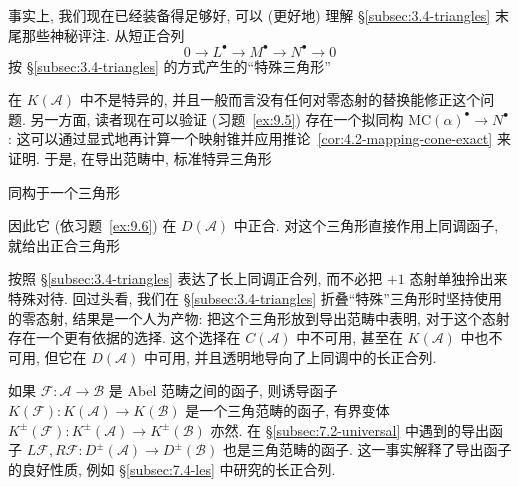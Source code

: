 事实上, 我们现在已经装备得足够好, 可以 (更好地) 理解 \S\ref{subsec:3.4-triangles} 末尾那些神秘评注. 从短正合列
\[
0 \longrightarrow L^\bullet \longrightarrow M^\bullet \longrightarrow N^\bullet \longrightarrow 0
\]
按 \S\ref{subsec:3.4-triangles} 的方式产生的“特殊三角形”
\begin{center}
\end{center}
在 $K(\mathcal{A})$ 中不是特异的, 并且一般而言没有任何对零态射的替换能修正这个问题. 另一方面, 读者现在可以验证 (习题~\ref{ex:9.5}) 存在一个拟同构 $\mathrm{MC}(\alpha)^\bullet\to N^\bullet$: 这可以通过显式地再计算一个映射锥并应用推论~\ref{cor:4.2-mapping-cone-exact} 来证明. 于是, 在导出范畴中, 标准特异三角形
\begin{center}
\end{center}
同构于一个三角形
\begin{center}
\end{center}
因此它 (依习题~\ref{ex:9.6}) 在 $D(\mathcal{A})$ 中正合. 对这个三角形直接作用上同调函子, 就给出正合三角形
\begin{center}
\end{center}
按照 \S\ref{subsec:3.4-triangles} 表达了长上同调正合列, 而不必把 $+1$ 态射单独拎出来特殊对待. 回过头看, 我们在 \S\ref{subsec:3.4-triangles} 折叠“特殊”三角形时坚持使用的零态射, 结果是一个人为产物: 把这个三角形放到导出范畴中表明, 对于这个态射存在一个更有依据的选择. 这个选择在 $C(\mathcal{A})$ 中不可用, 甚至在 $K(\mathcal{A})$ 中也不可用, 但它在 $D(\mathcal{A})$ 中可用, 并且透明地导向了上同调中的长正合列.

如果 $\mathcal{F}:\mathcal{A}\to\mathcal{B}$ 是 Abel 范畴之间的函子, 则诱导函子 $K(\mathcal{F}):K(\mathcal{A})\to K(\mathcal{B})$ 是一个三角范畴的函子, 有界变体 $K^\pm(\mathcal{F}):K^\pm(\mathcal{A})\to K^\pm(\mathcal{B})$ 亦然. 在 \S\ref{subsec:7.2-universal} 中遇到的导出函子 $L\mathcal{F},R\mathcal{F}:D^\pm(\mathcal{A})\to D^\pm(\mathcal{B})$ 也是三角范畴的函子. 这一事实解释了导出函子的良好性质, 例如 \S\ref{subsec:7.4-les} 中研究的长正合列.


